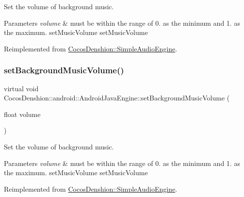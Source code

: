 Set the volume of background music.


\begin{DoxyParams}{Parameters}
{\em volume} & must be within the range of 0. as the minimum and 1. as the maximum.  set\+Music\+Volume  set\+Music\+Volume \\
\hline
\end{DoxyParams}


Reimplemented from \hyperlink{classCocosDenshion_1_1SimpleAudioEngine_a0a62f8945d7b81dbf80bae2331fa8cb3}{Cocos\+Denshion\+::\+Simple\+Audio\+Engine}.

\mbox{\label{classCocosDenshion_1_1android_1_1AndroidJavaEngine_ac134271d2bfbc3bfa9b54eeb86f4f750}} 
\subsubsection{\texorpdfstring{set\+Background\+Music\+Volume()}{setBackgroundMusicVolume()}\hspace{0.1cm}{\footnotesize\ttfamily [2/2]}}
{\footnotesize\ttfamily virtual void Cocos\+Denshion\+::android\+::\+Android\+Java\+Engine\+::set\+Background\+Music\+Volume (\begin{DoxyParamCaption}\item[{float}]{volume }\end{DoxyParamCaption})\hspace{0.3cm}{\ttfamily [virtual]}}

Set the volume of background music.


\begin{DoxyParams}{Parameters}
{\em volume} & must be within the range of 0. as the minimum and 1. as the maximum.  set\+Music\+Volume  set\+Music\+Volume \\
\hline
\end{DoxyParams}


Reimplemented from \hyperlink{classCocosDenshion_1_1SimpleAudioEngine_a0a62f8945d7b81dbf80bae2331fa8cb3}{Cocos\+Denshion\+::\+Simple\+Audio\+Engine}.

\mbox{\label{classCocosDenshion_1_1android_1_1AndroidJavaEngine_a409927c7297304f191bf3b96c289fb7a}} 

